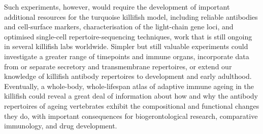 Such experiments, however, would require the development of important additional resources for the turquoise killifish model, including reliable antibodies and cell-surface markers, characterisation of the light-chain gene loci, and optimised single-cell repertoire-sequencing techniques, work that is still ongoing in several killifish labs worldwide. Simpler but still valuable experiments could investigate a greater range of timepoints and immune organs, incorporate data from  or separate secretory and transmembrane  repertoires, or extend our knowledge of killifish antibody repertoires to development and early adulthood. Eventually, a whole-body, whole-lifespan atlas of adaptive immune ageing in the killifish could reveal a great deal of information about how and why the antibody repertoires of ageing vertebrates exhibit the compositional and functional changes they do, with important consequences for biogerontological research, comparative immunology, and drug development.